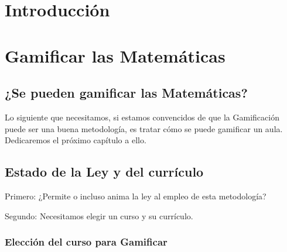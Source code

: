 \documentclass[a4paper, 12pt]{book}
\begin{document}





\cleardoublepage
{} %
\chapter{Introducción}






\cleardoublepage
\chapter{Gamificar las Matemáticas}

\section{¿Se pueden gamificar las Matemáticas?}

Lo siguiente que necesitamos, si estamos convencidos de que la Gamificación puede ser una buena metodología, es tratar cómo se puede gamificar un aula.
%
Dedicaremos el próximo capítulo a ello.

\section{Estado de la Ley y del currículo}

Primero: ¿Permite o incluso anima la ley al empleo de esta metodología?

Segundo: Necesitamos elegir un curso y su currículo.

\subsection{Elección del curso para Gamificar}
\end{document}
